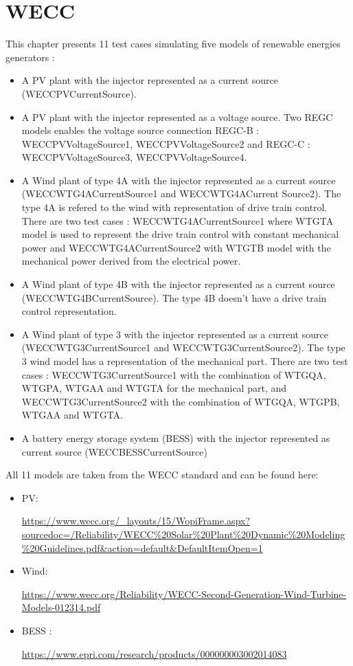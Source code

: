 \documentclass[a4paper, 12pt]{report}
\begin{document}
\newpage

\chapter{WECC}

This chapter presents 11 test cases simulating five models of renewable energies generators :
\begin{itemize}
\item A PV plant with the injector represented as a current source (WECCPVCurrentSource).
\item A PV plant with the injector represented as a voltage source. Two REGC models enables the voltage source connection REGC-B : WECCPVVoltageSource1, WECCPVVoltageSource2 and REGC-C : WECCPVVoltageSource3, WECCPVVoltageSource4.
\item A Wind plant of type 4A with the injector represented as a current source (WECCWTG4ACurrentSource1 and WECCWTG4ACurrent
Source2).
The type 4A is refered to the wind with representation of drive train control. There are two test cases : WECCWTG4ACurrentSource1 where WTGTA model is used to represent the drive train control with constant mechanical power and  WECCWTG4ACurrentSource2 with WTGTB model with the mechanical power derived from the electrical power.
\item A Wind plant of type 4B with the injector represented as a current source (WECCWTG4BCurrentSource). The type 4B doesn't have a drive train control representation.
\item A Wind plant of type 3  with the injector represented as a current source (WECCWTG3CurrentSource1 and WECCWTG3CurrentSource2). The type 3 wind model has a representation of the mechanical part. There are two test cases :  WECCWTG3CurrentSource1 with the combination of WTGQA, WTGPA, WTGAA and WTGTA for the mechanical part, and WECCWTG3CurrentSource2 with the combination of WTGQA, WTGPB, WTGAA and WTGTA.
\item A battery energy storage system (BESS) with the injector represented as current source (WECCBESSCurrentSource)
\end{itemize}

All 11 models are taken from the WECC standard and can be found here:
\begin{itemize}
\item PV:

\url{https://www.wecc.org/\_layouts/15/WopiFrame.aspx?sourcedoc=/Reliability/WECC\%20Solar\%20Plant\%20Dynamic\%20Modeling\%20Guidelines.pdf\&action=default\&DefaultItemOpen=1}

\item Wind:

\url{https://www.wecc.org/Reliability/WECC-Second-Generation-Wind-Turbine-Models-012314.pdf}


\item BESS :

\url{https://www.epri.com/research/products/000000003002014083}
\end{itemize}
\end{document}
